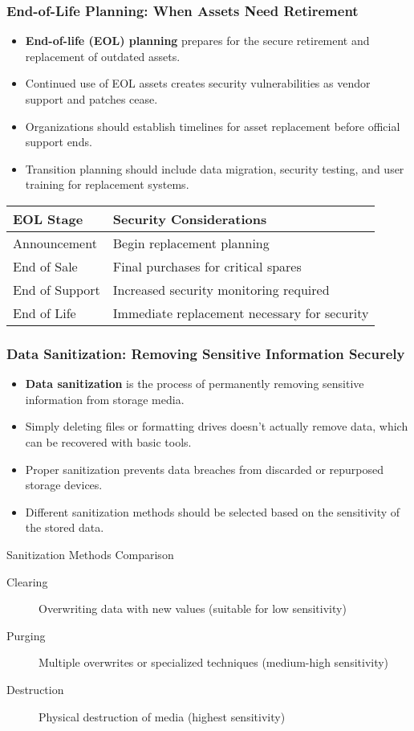 \documentclass{beamer}
\begin{document}
\begin{frame}
\frametitle{End-of-Life Planning: When Assets Need Retirement}
\begin{itemize}
\item \textbf{End-of-life (EOL) planning} prepares for the secure retirement and replacement of outdated assets.
\item Continued use of EOL assets creates security vulnerabilities as vendor support and patches cease.
\item Organizations should establish timelines for asset replacement before official support ends.
\item Transition planning should include data migration, security testing, and user training for replacement systems.
\end{itemize}

\begin{table}
    \scriptsize
\begin{tabular}{|l|p{5cm}|}
\hline
\textbf{EOL Stage} & \textbf{Security Considerations} \\
\hline
Announcement & Begin replacement planning \\
End of Sale & Final purchases for critical spares \\
End of Support & Increased security monitoring required \\
End of Life & Immediate replacement necessary for security \\
\hline
\end{tabular}
\end{table}
\end{frame}

\begin{frame}
\frametitle{Data Sanitization: Removing Sensitive Information Securely}
\begin{itemize}
\item \textbf{Data sanitization} is the process of permanently removing sensitive information from storage media.
\item Simply deleting files or formatting drives doesn't actually remove data, which can be recovered with basic tools.
\item Proper sanitization prevents data breaches from discarded or repurposed storage devices.
\item Different sanitization methods should be selected based on the sensitivity of the stored data.
\end{itemize}

\begin{exampleblock}{Sanitization Methods Comparison}
\begin{description}
    \item[Clearing] Overwriting data with new values (suitable for low sensitivity)
    \item[Purging] Multiple overwrites or specialized techniques (medium-high sensitivity)
    \item[Destruction] Physical destruction of media (highest sensitivity)
\end{description}
\end{exampleblock}
\end{frame}
\end{document}
